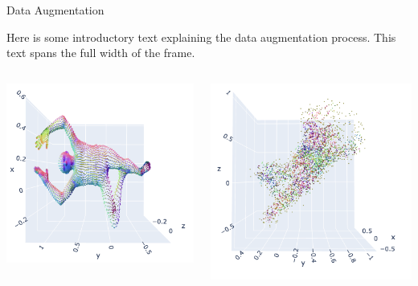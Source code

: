 \documentclass{beamer}
\begin{document}
\begin{frame}{Data Augmentation}

  Here is some introductory text explaining the data augmentation process. This text spans the full width of the frame.
  
  \vspace{1em}

  \begin{columns}[T]
      \centering
      \includegraphics[width=0.9\linewidth, height=0.6\linewidth, keepaspectratio=false]{../Media/example/registration.png}

      \centering
      \hspace{1em}
      \includegraphics[width=0.84\linewidth]{../Media/example/augmented_noisy_cloud.png}
  \end{columns}
  
  \end{frame}
\end{document}
